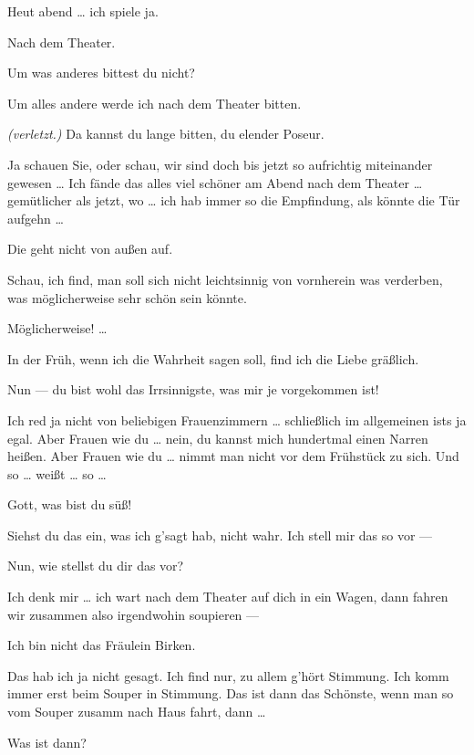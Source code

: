 \documentclass[
	final,
	a4paper,
	ngerman,
	mpinclude = true, %
	twoside = true,
	open = right,
	cleardoublepage = plain,
	DIV = 13,
	BCOR = 1cm,
	titlepage = firstiscover,
	]{scrbook}
\newcommand{\direction}[1]{\textit{(#1)}}
\newcommand{\thecharacter}[1]{\textup{\textsc{#1}}}
\newcommand{\theschauspielerin}{\thecharacter{Schauspielerin}}
\newcommand{\thegraf}{\thecharacter{Graf}}
\newcommand{\character}[1]{\item[#1:]}
\newcommand{\schauspielerin}{\character{\theschauspielerin}}
\newcommand{\graf}{\character{\thegraf}}
\begin{document}
\begin{play}
	\schauspielerin
	Heut abend \ldots{} ich spiele ja.

	\graf
	Nach dem Theater.

	\schauspielerin
	Um was anderes bittest du nicht?

	\graf
	Um alles andere werde ich nach dem Theater bitten.

	\schauspielerin
	\direction{verletzt.} Da kannst du lange bitten, du elender Poseur.

	\graf
	Ja schauen Sie, oder schau, wir sind doch bis jetzt so aufrichtig miteinander gewesen \ldots{} Ich fände das alles viel schöner am Abend nach dem Theater \ldots{} gemütlicher als jetzt, wo \ldots{} ich hab immer so die Empfindung, als könnte die Tür aufgehn \ldots{}

	\schauspielerin
	Die geht nicht von außen auf.

	\graf
	Schau, ich find, man soll sich nicht leichtsinnig von vornherein was verderben, was möglicherweise sehr schön sein könnte.

	\schauspielerin
	Möglicherweise! \ldots{}

	\graf
	In der Früh, wenn ich die Wahrheit sagen soll, find ich die Liebe gräßlich.

	\schauspielerin
	Nun --- du bist wohl das Irrsinnigste, was mir je vorgekommen ist!

	\graf
	Ich red ja nicht von beliebigen Frauenzimmern \ldots{} schließlich im allgemeinen ists ja egal. Aber Frauen wie du \ldots{} nein, du kannst mich hundertmal einen Narren heißen. Aber Frauen wie du \ldots{} nimmt man nicht vor dem Frühstück zu sich. Und so \ldots{} weißt \ldots{} so \ldots{}

	\schauspielerin
	Gott, was bist du süß!

	\graf
	Siehst du das ein, was ich g'sagt hab, nicht wahr. Ich stell mir das so vor ---

	\schauspielerin
	Nun, wie stellst du dir das vor?

	\graf
	Ich denk mir \ldots{} ich wart nach dem Theater auf dich in ein Wagen, dann fahren wir zusammen also irgendwohin soupieren ---

	\schauspielerin
	Ich bin nicht das Fräulein Birken.

	\graf
	Das hab ich ja nicht gesagt. Ich find nur, zu allem g'hört Stimmung. Ich komm immer erst beim Souper in Stimmung. Das ist dann das Schönste, wenn man so vom Souper zusamm nach Haus fahrt, dann \ldots{}

	\schauspielerin
	Was ist dann?


\end{play}
\end{document}
